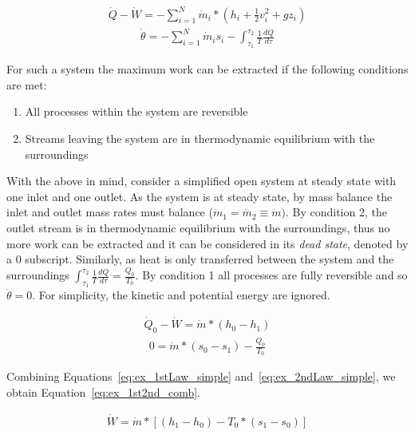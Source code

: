         \begin{align} 
            \Dot{Q} - \Dot{W} = - \sum_{i=1}^N \Dot{m}_i*(h_i + \frac{1}{2}v_i^2 + gz_i) \label{eq:ex_1stLaw_general}
        \end{align}
        \begin{align}
            \Dot{\theta} = - \sum_{i=1}^N \Dot{m}_is_i - \int_{\tau_1}^{\tau_2} \frac{1}{T} \frac{dQ}{d\tau} \label{eq:ex_2ndLaw_general}
        \end{align}
    
        For such a system the maximum work can be extracted if the following conditions are met:
        \begin{enumerate}
            \item All processes within the system are reversible 
            \item Streams leaving the system are in thermodynamic equilibrium with the surroundings
        \end{enumerate}
    
        With the above in mind, consider a simplified open system at steady state with one inlet and one outlet. As the system is at steady state, by mass balance the inlet and outlet mass rates must balance (\(\Dot{m}_1=\Dot{m}_2\equiv\Dot{m})\). By condition 2, the outlet stream is in thermodynamic equilibrium with the surroundings, thus no more work can be extracted and it can be considered in its \emph{dead state}, denoted by a 0 subscript. Similarly, as heat is only transferred between the system and the surroundings \(\int_{\tau_1}^{\tau_2} \frac{1}{T} \frac{dQ}{d\tau} = \frac{Q_0}{T_0}\). By condition 1 all processes are fully reversible and so \(\Dot{\theta} = 0\). For simplicity, the kinetic and potential energy are ignored.
    
        \begin{align} 
            \Dot{Q}_0 - \Dot{W} = \Dot{m}*(h_0 - h_1) \label{eq:ex_1stLaw_simple}
        \end{align}
        \begin{align}
            0 = \Dot{m}*(s_0 - s_1) - \frac{Q_0}{T_0} \label{eq:ex_2ndLaw_simple}
        \end{align}
    
        Combining Equations~\eqref{eq:ex_1stLaw_simple} and~\eqref{eq:ex_2ndLaw_simple}, we obtain Equation~\eqref{eq:ex_1st2nd_comb}.
    
        \begin{align} 
            \Dot{W} = \Dot{m}*[(h_1 - h_0) - T_0*(s_1 - s_0)] \label{eq:ex_1st2nd_comb}
        \end{align}
    
